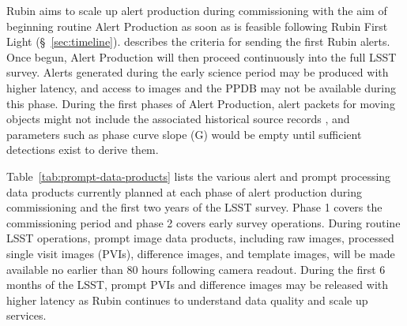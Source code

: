 Rubin aims to scale up alert production during commissioning with the aim of beginning routine Alert Production as soon as is feasible following Rubin First Light  (\S~\ref{sec:timeline}).
 describes the criteria for sending the first Rubin alerts.
Once begun, Alert Production will then proceed continuously into the full LSST survey.
Alerts generated during the early science period may be produced with higher latency, and access to images and the PPDB may not be available during this phase.
During the first phases of Alert Production, alert packets for moving objects might not include the associated historical source records , and parameters such as phase curve slope (G) would be empty until sufficient detections exist to derive them.

Table~\ref{tab:prompt-data-products} lists the various alert and prompt processing data products currently planned at each phase of alert production during commissioning and the first two years of the LSST survey. 
Phase 1 covers the commissioning period and phase 2 covers early survey operations.  
During routine LSST operations, prompt image data products, including  raw images, processed single visit images (PVIs), difference images, and template images, will be made available no earlier than 80 hours following camera readout. 
During the first 6 months of the LSST,  prompt PVIs and difference images may be released with higher latency as Rubin continues to understand data quality and scale up services.




